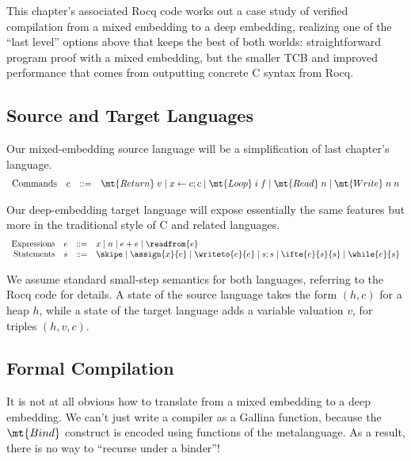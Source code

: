 \documentclass{amsbook}
\theoremstyle{definition}
\theoremstyle{remark}
\numberwithin{section}{chapter}
\numberwithin{equation}{chapter}
\begin{document}
This chapter's associated Rocq code works out a case study of verified compilation from a mixed embedding to a deep embedding, realizing one of the ``last level'' options above that keeps the best of both worlds: straightforward program proof with a mixed embedding, but the smaller TCB and improved performance that comes from outputting concrete C syntax from Rocq.

\subsection{Source and Target Languages}

Our mixed-embedding source language will be a simplification of last chapter's language.
$$\begin{array}{rrcl}
  \textrm{Commands} & c &::=& \mt{Return} \; v \mid x \leftarrow c; c \mid \mt{Loop} \; i \; f \mid \mt{Read} \; n \mid \mt{Write} \; n \; n
\end{array}$$

Our deep-embedding target language will expose essentially the same features but more in the traditional style of C and related languages.
$$\begin{array}{rrcl}
  \textrm{Expressions} & e &::=& x \mid n \mid e + e \mid \readfrom{e} \\
  \textrm{Statements} &s &::=& \skipe \mid \assign{x}{e} \mid \writeto{e}{e} \mid s; s \mid \ifte{e}{s}{s} \mid \while{e}{s}
\end{array}$$

We assume standard small-step semantics for both languages, referring to the Rocq code for details.
A state of the source language takes the form $(h, c)$ for a heap $h$, while a state of the target language adds a variable valuation $v$, for triples $(h, v, c)$.

\subsection{Formal Compilation}

It is not at all obvious how to translate from a mixed embedding to a deep embedding.
We can't just write a compiler as a Gallina function, because the $\mt{Bind}$ construct is encoded using functions of the metalanguage.
As a result, there is no way to ``recurse under a binder''!

\newcommand{\dscomp}[3]{#1 \vdash #2 \hookrightarrow #3}
\end{document}
